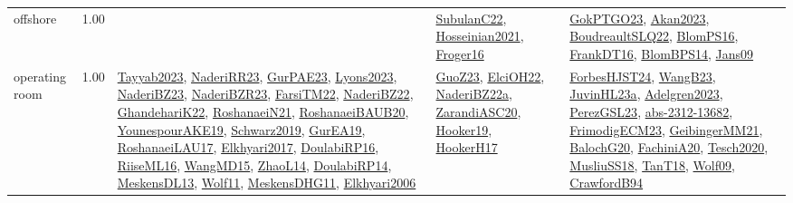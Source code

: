 {\begin{longtable}{p{3cm}r>{\raggedright\arraybackslash}p{6cm}>{\raggedright\arraybackslash}p{6cm}>{\raggedright\arraybackslash}p{8cm}}
\index{offshore}\index{ApplicationAreas!offshore}offshore &  1.00 &  & \hyperref[detail:SubulanC22]{SubulanC22}, \hyperref[detail:Hosseinian2021]{Hosseinian2021}, \hyperref[detail:Froger16]{Froger16} & \hyperref[detail:GokPTGO23]{GokPTGO23}, \hyperref[detail:Akan2023]{Akan2023}, \hyperref[detail:BoudreaultSLQ22]{BoudreaultSLQ22}, \hyperref[detail:BlomPS16]{BlomPS16}, \hyperref[detail:FrankDT16]{FrankDT16}, \hyperref[detail:BlomBPS14]{BlomBPS14}, \hyperref[detail:Jans09]{Jans09}\\
\index{operating room}\index{ApplicationAreas!operating room}operating room &  1.00 & \hyperref[detail:Tayyab2023]{Tayyab2023}, \hyperref[detail:NaderiRR23]{NaderiRR23}, \hyperref[detail:GurPAE23]{GurPAE23}, \hyperref[detail:Lyons2023]{Lyons2023}, \hyperref[detail:NaderiBZ23]{NaderiBZ23}, \hyperref[detail:NaderiBZR23]{NaderiBZR23}, \hyperref[detail:FarsiTM22]{FarsiTM22}, \hyperref[detail:NaderiBZ22]{NaderiBZ22}, \hyperref[detail:GhandehariK22]{GhandehariK22}, \hyperref[detail:RoshanaeiN21]{RoshanaeiN21}, \hyperref[detail:RoshanaeiBAUB20]{RoshanaeiBAUB20}, \hyperref[detail:YounespourAKE19]{YounespourAKE19}, \hyperref[detail:Schwarz2019]{Schwarz2019}, \hyperref[detail:GurEA19]{GurEA19}, \hyperref[detail:RoshanaeiLAU17]{RoshanaeiLAU17}, \hyperref[detail:Elkhyari2017]{Elkhyari2017}, \hyperref[detail:DoulabiRP16]{DoulabiRP16}, \hyperref[detail:RiiseML16]{RiiseML16}, \hyperref[detail:WangMD15]{WangMD15}, \hyperref[detail:ZhaoL14]{ZhaoL14}, \hyperref[detail:DoulabiRP14]{DoulabiRP14}, \hyperref[detail:MeskensDL13]{MeskensDL13}, \hyperref[detail:Wolf11]{Wolf11}, \hyperref[detail:MeskensDHG11]{MeskensDHG11}, \hyperref[detail:Elkhyari2006]{Elkhyari2006} & \hyperref[detail:GuoZ23]{GuoZ23}, \hyperref[detail:ElciOH22]{ElciOH22}, \hyperref[detail:NaderiBZ22a]{NaderiBZ22a}, \hyperref[detail:ZarandiASC20]{ZarandiASC20}, \hyperref[detail:Hooker19]{Hooker19}, \hyperref[detail:HookerH17]{HookerH17} & \hyperref[detail:ForbesHJST24]{ForbesHJST24}, \hyperref[detail:WangB23]{WangB23}, \hyperref[detail:JuvinHL23a]{JuvinHL23a}, \hyperref[detail:Adelgren2023]{Adelgren2023}, \hyperref[detail:PerezGSL23]{PerezGSL23}, \hyperref[detail:abs-2312-13682]{abs-2312-13682}, \hyperref[detail:FrimodigECM23]{FrimodigECM23}, \hyperref[detail:GeibingerMM21]{GeibingerMM21}, \hyperref[detail:BalochG20]{BalochG20}, \hyperref[detail:FachiniA20]{FachiniA20}, \hyperref[detail:Tesch2020]{Tesch2020}, \hyperref[detail:MusliuSS18]{MusliuSS18}, \hyperref[detail:TanT18]{TanT18}, \hyperref[detail:Wolf09]{Wolf09}, \hyperref[detail:CrawfordB94]{CrawfordB94}\\

\end{longtable}}
